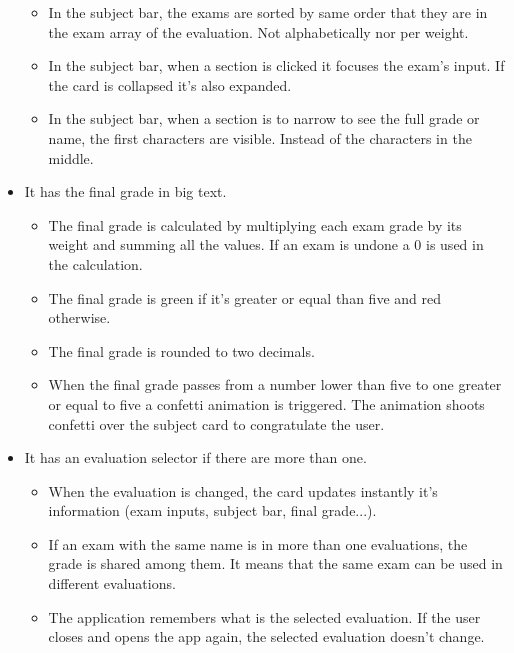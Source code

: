 \begin{itemize}[leftmargin=2cm]
\begin{itemize}[leftmargin=2cm]
        \item[\nextTask{}\label{req:x}] In the subject bar, the exams are sorted by same order that they are in the exam array of the evaluation. Not alphabetically nor per weight.
        \item[\nextTask{}\label{req:x}] In the subject bar, when a section is clicked it focuses the exam's input. If the card is collapsed it's also expanded.
        \item[\nextTask{}\label{req:x}] In the subject bar, when a section is to narrow to see the full grade or name, the first characters are visible. Instead of the characters in the middle. 
    \end{itemize}
    \item[\nextTask{}\label{req:x}] It has the final grade in big text.
    \begin{itemize}[leftmargin=2cm]
        \item[\nextTask{}\label{req:x}] The final grade is calculated by multiplying each exam grade by its weight and summing all the values. If an exam is undone a 0 is used in the calculation.
        \item[\nextTask{}\label{req:x}] The final grade is green if it's greater or equal than five and red otherwise.
        \item[\nextTask{}\label{req:x}] The final grade is rounded to two decimals.
        \item[\nextTask{}\label{req:x}] When the final grade passes from a number lower than five to one greater or equal to five a confetti animation is triggered. The animation shoots confetti over the subject card to congratulate the user. 
    \end{itemize}
    \item[\nextTask{}\label{req:x}] It has an evaluation selector if there are more than one.
    \begin{itemize}[leftmargin=2cm]
        \item[\nextTask{}\label{req:x}] When the evaluation is changed, the card updates instantly it's information (exam inputs, subject bar, final grade...).
        \item[\nextTask{}\label{req:x}] If an exam with the same name is in more than one evaluations, the grade is shared among them. It means that the same exam can be used in different evaluations.
        \item[\nextTask{}\label{req:x}] The application remembers what is the selected evaluation. If the user closes and opens the app again, the selected evaluation doesn't change.

\end{itemize}
\end{itemize}
